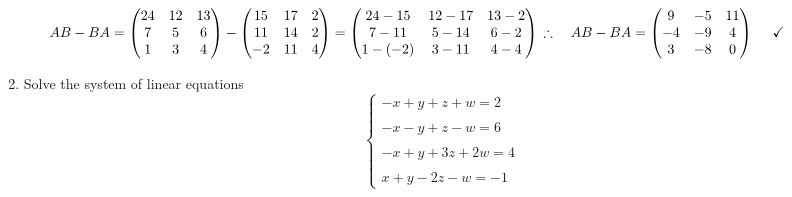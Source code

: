 \documentclass[fleqn]{article}
\begin{document}
\begin{enumerate}
\begin{itemize}
        \textcolor{hwColor}{
          $
            AB-BA=\begin{pmatrix}
              24 & 12 & 13 
              \\
              7 & 5 & 6 
              \\
              1 & 3 & 4
            \end{pmatrix}-\begin{pmatrix}
              15 & 17 & 2
              \\
              11 & 14 & 2
              \\
              -2 & 11 & 4
            \end{pmatrix}=\begin{pmatrix}
              24-15 & 12-17 & 13-2 
              \\
              7-11 & 5-14 & 6-2 
              \\
              1-(-2) & 3-11 & 4-4 
            \end{pmatrix}
            \\
            \\
            \\
            \therefore ~~~ AB-BA=\begin{pmatrix}
              9 & -5 & 11
              \\
              -4 & -9 & 4 
              \\
              3 & -8 & 0 
            \end{pmatrix} ~~~~ \checkmark
          $
        }

      \end{itemize}
    
    \item Solve the system of linear equations
      $$
        \begin{cases}
          -x+y+z+w=2 \\
          \\
          -x-y+z-w=6 \\
          \\
          -x+y+3z+2w=4 \\
          \\
          x+y-2z-w=-1
        \end{cases}
      $$


\end{enumerate}
\end{document}
